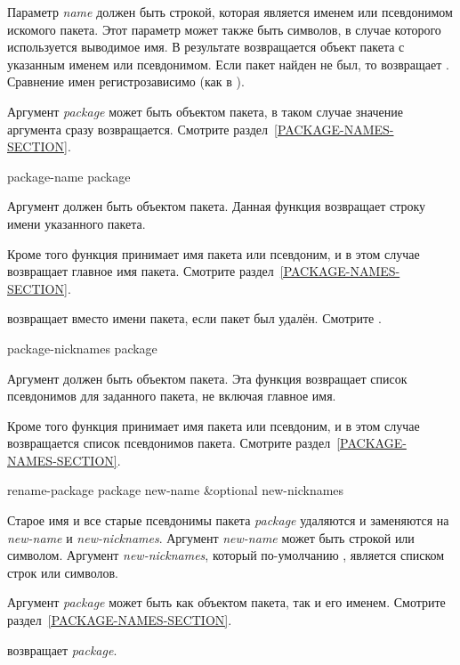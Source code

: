 \begin{defun}[Переменная]
\begin{defun}[Функция]
Параметр \emph{name} должен быть строкой, которая является именем или
псевдонимом искомого пакета. Этот параметр может также быть символов, в случае
которого используется выводимое имя. В результате возвращается объект пакета с
указанным именем или псевдонимом. Если пакет найден не был, то
 возвращает {\false}.
Сравнение имен регистрозависимо (как в ).

Аргумент \emph{package} может быть объектом пакета, в таком случае значение
аргумента сразу возвращается. Смотрите раздел~\ref{PACKAGE-NAMES-SECTION}.
\end{defun}

\begin{defun}[Функция]
package-name package

Аргумент должен быть объектом пакета. Данная функция возвращает строку имени
указанного пакета.

Кроме того функция принимает имя пакета или псевдоним, и в этом случае
возвращает главное имя пакета. Смотрите раздел~\ref{PACKAGE-NAMES-SECTION}.

 возвращает  вместо имени пакета, если пакет был
удалён. Смотрите .
\end{defun}

\begin{defun}[Функция]
package-nicknames package

Аргумент должен быть объектом пакета. Эта функция возвращает список псевдонимов
для заданного пакета, не включая главное имя.

Кроме того функция принимает имя пакета или псевдоним, и в этом случае
возвращается список псевдонимов пакета. Смотрите раздел~\ref{PACKAGE-NAMES-SECTION}.
\end{defun}

\begin{defun}[Функция]
rename-package package new-name &optional new-nicknames

Старое имя и все старые псевдонимы пакета \emph{package} удаляются и заменяются
на \emph{new-name} и \emph{new-nicknames}. Аргумент \emph{new-name} может быть
строкой или символом. Аргумент \emph{new-nicknames}, который по-умолчанию
{\false}, является списком строк или символов.

Аргумент \emph{package} может быть как объектом пакета, так и его
именем. Смотрите раздел~\ref{PACKAGE-NAMES-SECTION}.

 возвращает \emph{package}.
\end{defun}


\end{defun}
